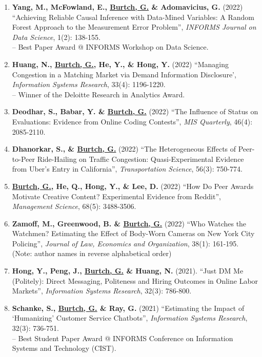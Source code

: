 \documentclass[10.5pt,letterpaper,sans]{moderncv}        %
\begin{document}
\begin{enumerate}[leftmargin=!,labelindent=5pt,itemindent=-15pt]
\item \textbf{Yang, M., McFowland, E., \underline{Burtch, G.} \& Adomavicius, G.} (2022) ``Achieving Reliable Causal Inference with Data-Mined Variables: A Random Forest Approach to the Measurement Error Problem'', \textit{INFORMS Journal on Data Science}, 1(2): 138-155.  \\-- Best Paper Award @ INFORMS Workshop on Data Science.

\item \textbf{Huang, N., \underline{Burtch, G.}, He, Y., \& Hong, Y.} (2022) ``Managing Congestion in a Matching Market via Demand Information Disclosure', \textit{Information Systems Research}, 33(4): 1196-1220. \\-- Winner of the Deloitte Research in Analytics Award.

\item \textbf{Deodhar, S., Babar, Y. \& \underline{Burtch, G.}} (2022) ``The Influence of Status on Evaluations: Evidence from Online Coding Contests'', \textit{MIS Quarterly}, 46(4): 2085-2110.

\item \textbf{Dhanorkar, S., \& \underline{Burtch, G.}} (2022) ``The Heterogeneous Effects of Peer-to-Peer Ride-Hailing on Traffic Congestion: Quasi-Experimental Evidence from Uber's Entry in California'', \textit{Transportation Science}, 56(3): 750-774.

\item \textbf{\underline{Burtch, G.}, He, Q., Hong, Y., \& Lee, D.} (2022) ``How Do Peer Awards Motivate Creative Content? Experimental Evidence from Reddit'', \textit{Management Science}, 68(5): 3488-3506.

\item \textbf{Zamoff, M., Greenwood, B. \& \underline{Burtch, G.}} (2022) ``Who Watches the Watchmen? Estimating the Effect of Body-Worn Cameras on New York City Policing'', \textit{Journal of Law, Economics and Organization}, 38(1): 161-195. (Note: author names in reverse alphabetical order)

\item \textbf{Hong, Y., Peng, J., \underline{Burtch, G.} \& Huang, N.} (2021). ``Just DM Me (Politely): Direct Messaging, Politeness and Hiring Outcomes in Online Labor Markets'', \textit{Information Systems Research}, 32(3): 786-800.

\item \textbf{Schanke, S., \underline{Burtch, G.} \& Ray, G.} (2021) ``Estimating the Impact of `Humanizing' Customer Service Chatbots'', \textit{Information Systems Research}, 32(3): 736-751. \\-- Best Student Paper Award @ INFORMS Conference on Information Systems and Technology (CIST).


\end{enumerate}
\end{document}

